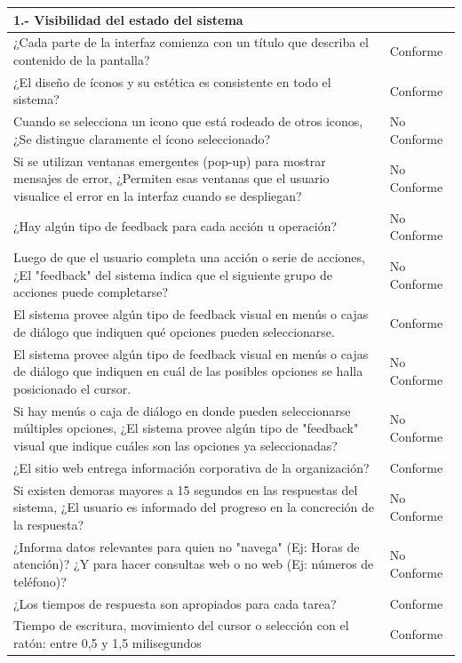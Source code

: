 \documentclass[stu, 12pt, letterpaper, donotrepeattitle, floatsintext, natbib]{apa7}
\begin{document}
\begin{longtable}{|>{\raggedright\arraybackslash}p{10cm}|>{\centering\arraybackslash}p{3cm}|}
    \textbf{1.- Visibilidad del estado del sistema} & \\ \hline
    ¿Cada parte de la interfaz comienza con un título que describa el contenido de la pantalla? & Conforme \\ \hline
    ¿El diseño de íconos y su estética es consistente en todo el sistema? & Conforme \\ \hline
    Cuando se selecciona un icono que está rodeado de otros iconos, ¿Se distingue claramente el ícono seleccionado? & No Conforme \\ \hline
    Si se utilizan ventanas emergentes (pop-up) para mostrar mensajes de error, ¿Permiten esas ventanas que el usuario visualice el error en la interfaz cuando se despliegan? & No Conforme\\ \hline
    ¿Hay algún tipo de feedback para cada acción u operación? & No Conforme\\ \hline
    Luego de que el usuario completa una acción o serie de acciones, ¿El "feedback" del sistema indica que el siguiente grupo de acciones puede completarse? & No Conforme\\ \hline
    El sistema provee algún tipo de feedback visual en menús o cajas de diálogo que indiquen qué opciones pueden seleccionarse. & Conforme \\ \hline
    El sistema provee algún tipo de feedback visual en menús o cajas de diálogo que indiquen en cuál de las posibles opciones se halla posicionado el cursor. & No Conforme \\ \hline
    Si hay menús o caja de diálogo en donde pueden seleccionarse múltiples opciones, ¿El sistema provee algún tipo de "feedback" visual que indique cuáles son las opciones ya seleccionadas? & No Conforme \\ \hline
    ¿El sitio web entrega información corporativa de la organización? & Conforme \\ \hline
    Si existen demoras mayores a 15 segundos en las respuestas del sistema, ¿El usuario es informado del progreso en la concreción de la respuesta? & No Conforme \\ \hline
    ¿Informa datos relevantes para quien no "navega" (Ej: Horas de atención)? ¿Y para hacer consultas web o no web (Ej: números de teléfono)? & No Conforme \\ \hline
    ¿Los tiempos de respuesta son apropiados para cada tarea? & Conforme \\ \hline
    Tiempo de escritura, movimiento del cursor o selección con el ratón: entre 0,5 y 1,5 milisegundos & Conforme \\ \hline

\end{longtable}
\end{document}
